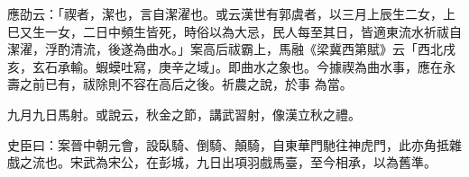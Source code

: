 \begin{pinyinscope}
 應劭云：「禊者，潔也，言自潔濯也。或云漢世有郭虞者，以三月上辰生二女，上巳又生一女，二日中頻生皆死，時俗以為大忌，民人每至其日，皆適東流水祈祓自潔濯，浮酌清流，後遂為曲水。」案高后祓霸上，馬融《梁冀西第賦》云「西北戌亥，玄石承輸。蝦蟆吐寫，庚辛之域」。即曲水之象也。今據禊為曲水事，應在永壽之前已有，祓除則不容在高后之後。祈農之說，於事
 為當。



 九月九日馬射。或說云，秋金之節，講武習射，像漢立秋之禮。



 史臣曰：案晉中朝元會，設臥騎、倒騎、顛騎，自東華門馳往神虎門，此亦角抵雜戲之流也。宋武為宋公，在彭城，九日出項羽戲馬臺，至今相承，以為舊準。



\end{pinyinscope}